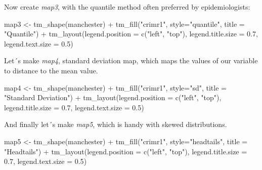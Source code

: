 \documentclass[
]{book}
\newenvironment{Shaded}{\begin{snugshade}}{\end{snugshade}}
\newcommand{\AttributeTok}[1]{\textcolor[rgb]{0.77,0.63,0.00}{#1}}
\newcommand{\FloatTok}[1]{\textcolor[rgb]{0.00,0.00,0.81}{#1}}
\newcommand{\FunctionTok}[1]{\textcolor[rgb]{0.00,0.00,0.00}{#1}}
\newcommand{\NormalTok}[1]{#1}
\newcommand{\OtherTok}[1]{\textcolor[rgb]{0.56,0.35,0.01}{#1}}
\newcommand{\SpecialCharTok}[1]{\textcolor[rgb]{0.00,0.00,0.00}{#1}}
\newcommand{\StringTok}[1]{\textcolor[rgb]{0.31,0.60,0.02}{#1}}
\begin{document}
Now create \emph{map3}, with the quantile method often preferred by epidemiologists:

\begin{Shaded}
\begin{Highlighting}[]
\NormalTok{map3 }\OtherTok{\textless{}{-}} \FunctionTok{tm\_shape}\NormalTok{(manchester) }\SpecialCharTok{+} 
  \FunctionTok{tm\_fill}\NormalTok{(}\StringTok{"crimr1"}\NormalTok{, }\AttributeTok{style=}\StringTok{"quantile"}\NormalTok{, }\AttributeTok{title =} \StringTok{"Quantile"}\NormalTok{) }\SpecialCharTok{+}
  \FunctionTok{tm\_layout}\NormalTok{(}\AttributeTok{legend.position =} \FunctionTok{c}\NormalTok{(}\StringTok{"left"}\NormalTok{, }\StringTok{"top"}\NormalTok{), }
            \AttributeTok{legend.title.size =} \FloatTok{0.7}\NormalTok{,}
            \AttributeTok{legend.text.size =} \FloatTok{0.5}\NormalTok{)}
\end{Highlighting}
\end{Shaded}

Let´s make \emph{map4}, standard deviation map, which maps the values of our variable to distance to the mean value.

\begin{Shaded}
\begin{Highlighting}[]
\NormalTok{map4 }\OtherTok{\textless{}{-}} \FunctionTok{tm\_shape}\NormalTok{(manchester) }\SpecialCharTok{+} 
  \FunctionTok{tm\_fill}\NormalTok{(}\StringTok{"crimr1"}\NormalTok{, }\AttributeTok{style=}\StringTok{"sd"}\NormalTok{, }\AttributeTok{title =} \StringTok{"Standard Deviation"}\NormalTok{) }\SpecialCharTok{+}
  \FunctionTok{tm\_layout}\NormalTok{(}\AttributeTok{legend.position =} \FunctionTok{c}\NormalTok{(}\StringTok{"left"}\NormalTok{, }\StringTok{"top"}\NormalTok{), }
            \AttributeTok{legend.title.size =} \FloatTok{0.7}\NormalTok{,}
            \AttributeTok{legend.text.size =} \FloatTok{0.5}\NormalTok{)}
\end{Highlighting}
\end{Shaded}

And finally let´s make \emph{map5}, which is handy with skewed distributions.

\begin{Shaded}
\begin{Highlighting}[]
\NormalTok{map5 }\OtherTok{\textless{}{-}} \FunctionTok{tm\_shape}\NormalTok{(manchester) }\SpecialCharTok{+} 
  \FunctionTok{tm\_fill}\NormalTok{(}\StringTok{"crimr1"}\NormalTok{, }\AttributeTok{style=}\StringTok{"headtails"}\NormalTok{, }\AttributeTok{title =} \StringTok{"Headtails"}\NormalTok{) }\SpecialCharTok{+}
  \FunctionTok{tm\_layout}\NormalTok{(}\AttributeTok{legend.position =} \FunctionTok{c}\NormalTok{(}\StringTok{"left"}\NormalTok{, }\StringTok{"top"}\NormalTok{), }
            \AttributeTok{legend.title.size =} \FloatTok{0.7}\NormalTok{,}
            \AttributeTok{legend.text.size =} \FloatTok{0.5}\NormalTok{)}
\end{Highlighting}
\end{Shaded}
\end{document}
